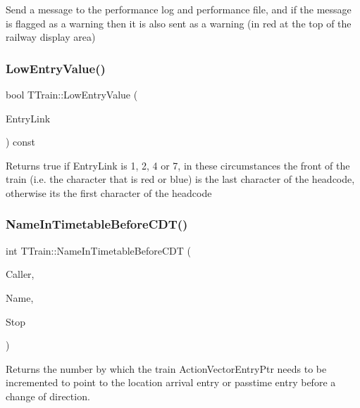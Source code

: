 Send a message to the performance log and performance file, and if the message is flagged as a warning then it is also sent as a warning (in red at the top of the railway display area) \mbox{\label{class_t_train_ac2f3802b0d193d220ec6d19e2a6fc7ed}} 
\subsubsection{\texorpdfstring{Low\+Entry\+Value()}{LowEntryValue()}}
{\footnotesize\ttfamily bool T\+Train\+::\+Low\+Entry\+Value (\begin{DoxyParamCaption}\item[{int}]{Entry\+Link }\end{DoxyParamCaption}) const\hspace{0.3cm}{\ttfamily [private]}}

Returns true if Entry\+Link is 1, 2, 4 or 7, in these circumstances the front of the train (i.\+e. the character that is red or blue) is the last character of the headcode, otherwise it\textquotesingle{}s the first character of the headcode \mbox{\label{class_t_train_a7a54125a3a5052cb25e17014075a686b}} 
\subsubsection{\texorpdfstring{Name\+In\+Timetable\+Before\+C\+D\+T()}{NameInTimetableBeforeCDT()}}
{\footnotesize\ttfamily int T\+Train\+::\+Name\+In\+Timetable\+Before\+C\+DT (\begin{DoxyParamCaption}\item[{int}]{Caller,  }\item[{Ansi\+String}]{Name,  }\item[{bool \&}]{Stop }\end{DoxyParamCaption})\hspace{0.3cm}{\ttfamily [private]}}

Returns the number by which the train Action\+Vector\+Entry\+Ptr needs to be incremented to point to the location arrival entry or passtime entry before a change of direction.

